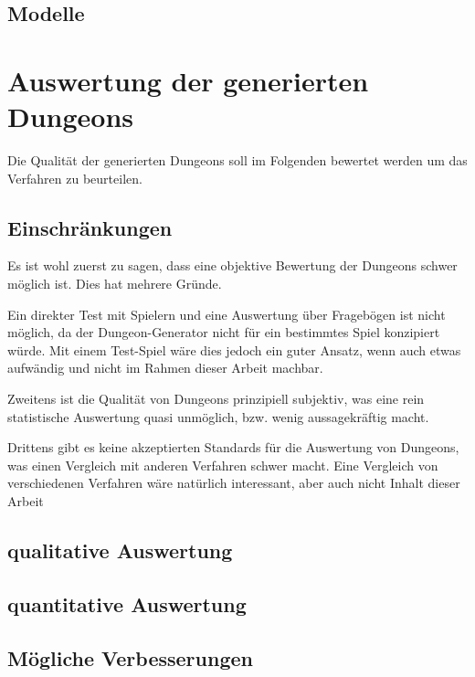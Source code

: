 \section{Modelle}

\chapter{Auswertung der generierten Dungeons}

Die Qualität der generierten Dungeons soll im Folgenden bewertet werden um das Verfahren zu beurteilen. 

\section{Einschränkungen}

Es ist wohl zuerst zu sagen, dass eine objektive Bewertung der Dungeons schwer möglich ist. Dies hat mehrere Gründe.

Ein direkter Test mit Spielern und eine Auswertung über Fragebögen ist nicht möglich, da der Dungeon-Generator nicht für ein bestimmtes Spiel konzipiert würde. Mit einem Test-Spiel wäre dies jedoch ein guter Ansatz, wenn auch etwas aufwändig und nicht im Rahmen dieser Arbeit machbar.

Zweitens ist die Qualität von Dungeons prinzipiell subjektiv, was eine rein statistische Auswertung quasi unmöglich, bzw. wenig aussagekräftig macht.

Drittens gibt es keine akzeptierten Standards für die Auswertung von Dungeons, was einen Vergleich mit anderen Verfahren schwer macht. Eine Vergleich von verschiedenen Verfahren wäre natürlich interessant, aber auch nicht Inhalt dieser Arbeit 

\section{qualitative Auswertung}

\section{quantitative Auswertung}


\section{Mögliche Verbesserungen}\label{s.verbesserungen}

